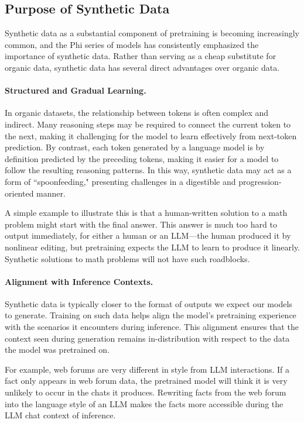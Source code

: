 \subsection{Purpose of Synthetic Data}

Synthetic data as a substantial component of pretraining is becoming increasingly common, and the Phi series of models has consistently emphasized the importance of synthetic data.  Rather than serving as a cheap substitute for organic data, synthetic data has several direct advantages over organic data.

\paragraph{Structured and Gradual Learning.} In organic datasets, the relationship between tokens is often complex and indirect. Many reasoning steps may be required to connect the current token to the next, making it challenging for the model to learn effectively from next-token prediction. By contrast, each token generated by a language model is by definition predicted by the preceding tokens, making it easier for a model to follow the resulting reasoning patterns. In this way, synthetic data may act as a form of ``spoonfeeding," presenting challenges in a digestible and progression-oriented manner.

A simple example to illustrate this is that a human-written solution to a math problem might start with the final answer.  This answer is much too hard to output immediately, for either a human or an LLM---the human produced it by nonlinear editing, but pretraining expects the LLM to learn to produce it linearly.  Synthetic solutions to math problems will not have such roadblocks.

\paragraph{Alignment with Inference Contexts.} Synthetic data is typically closer to the format of outputs we expect our models to generate. Training on such data helps align the model’s pretraining experience with the scenarios it encounters during inference. This alignment ensures that the context seen during generation remains in-distribution with respect to the data the model was pretrained on.

For example, web forums are very different in style from LLM interactions.  If a fact only appears in web forum data, the pretrained model will think it is very unlikely to occur in the chats it produces.  Rewriting facts from the web forum into the language style of an LLM makes the facts more accessible during the LLM chat context of inference.


